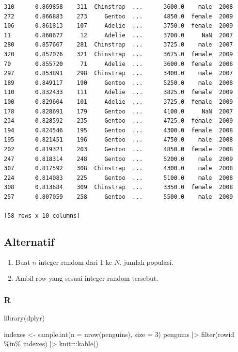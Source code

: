 \documentclass[
  letterpaper,
  DIV=11,
  numbers=noendperiod]{scrreprt}
\newenvironment{Shaded}{\begin{snugshade}}{\end{snugshade}}
\newcommand{\AttributeTok}[1]{\textcolor[rgb]{0.40,0.45,0.13}{#1}}
\newcommand{\DecValTok}[1]{\textcolor[rgb]{0.68,0.00,0.00}{#1}}
\newcommand{\FunctionTok}[1]{\textcolor[rgb]{0.28,0.35,0.67}{#1}}
\newcommand{\NormalTok}[1]{\textcolor[rgb]{0.00,0.23,0.31}{#1}}
\newcommand{\OtherTok}[1]{\textcolor[rgb]{0.00,0.23,0.31}{#1}}
\newcommand{\SpecialCharTok}[1]{\textcolor[rgb]{0.37,0.37,0.37}{#1}}
\providecommand{\tightlist}{%
  \setlength{\itemsep}{0pt}\setlength{\parskip}{0pt}}\usepackage{longtable,booktabs,array}
\begin{document}
\begin{verbatim}
310      0.869858    311  Chinstrap  ...      3600.0    male  2008
272      0.866883    273     Gentoo  ...      4850.0  female  2009
106      0.861813    107     Adelie  ...      3750.0  female  2009
11       0.860677     12     Adelie  ...      3700.0     NaN  2007
280      0.857667    281  Chinstrap  ...      3725.0    male  2007
320      0.857076    321  Chinstrap  ...      3675.0  female  2009
70       0.855720     71     Adelie  ...      3600.0  female  2008
297      0.853891    298  Chinstrap  ...      3400.0    male  2007
189      0.849117    190     Gentoo  ...      5250.0    male  2008
110      0.832433    111     Adelie  ...      3825.0  female  2009
100      0.829604    101     Adelie  ...      3725.0  female  2009
178      0.828691    179     Gentoo  ...      4100.0     NaN  2007
234      0.828592    235     Gentoo  ...      4725.0  female  2009
194      0.824546    195     Gentoo  ...      4300.0  female  2008
195      0.821451    196     Gentoo  ...      4750.0    male  2008
202      0.819321    203     Gentoo  ...      4850.0  female  2008
247      0.818314    248     Gentoo  ...      5200.0    male  2009
307      0.817592    308  Chinstrap  ...      4300.0    male  2008
224      0.814083    225     Gentoo  ...      5100.0    male  2008
308      0.813684    309  Chinstrap  ...      3350.0  female  2008
257      0.807059    258     Gentoo  ...      5500.0    male  2009

[58 rows x 10 columns]
\end{verbatim}

\hypertarget{alternatif}{%
\subsection{Alternatif}\label{alternatif}}

\begin{enumerate}
\def\labelenumi{\arabic{enumi}.}
\tightlist
\item
  Buat \(n\) integer random dari \(1\) ke \(N\), jumlah populasi.
\item
  Ambil row yang sesuai integer random tersebut.
\end{enumerate}

\hypertarget{r-4}{%
\subsubsection{R}\label{r-4}}

\begin{Shaded}
\begin{Highlighting}[]
\FunctionTok{library}\NormalTok{(dplyr)}

\NormalTok{indexes }\OtherTok{\textless{}{-}} \FunctionTok{sample.int}\NormalTok{(}\AttributeTok{n =} \FunctionTok{nrow}\NormalTok{(penguins), }\AttributeTok{size =} \DecValTok{3}\NormalTok{)}
\NormalTok{penguins }\SpecialCharTok{|\textgreater{}} \FunctionTok{filter}\NormalTok{(rowid }\SpecialCharTok{\%in\%}\NormalTok{ indexes) }\SpecialCharTok{|\textgreater{}}\NormalTok{ knitr}\SpecialCharTok{::}\FunctionTok{kable}\NormalTok{()}
\end{Highlighting}
\end{Shaded}
\end{document}
